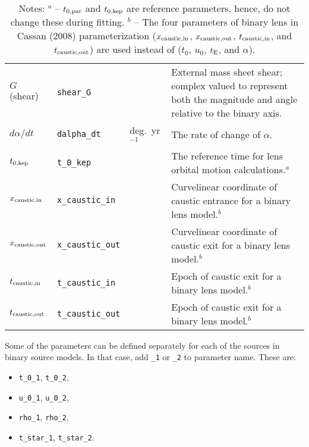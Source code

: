 \documentclass[12pt]{article}
\begin{document}
\begin{table*}[!h]
\begin{tabular}{l l l p{10cm}}
$G$ (shear) & {\tt shear\_G} & & External mass sheet shear; complex valued to represent both the magnitude and angle relative to the binary axis. \\
$d\alpha/dt$ & {\tt dalpha\_dt} & deg.~yr$^{-1}$ & The rate of change of $\alpha$. \\
$t_{0,{\rm kep}}$ & {\tt t\_0\_kep} & & The reference time for lens orbital motion calculations.$^a$ \\
$x_{\rm caustic, in}$ & {\tt x\_caustic\_in} & & Curvelinear coordinate of caustic entrance for a binary lens model.$^b$ \\
$x_{\rm caustic, out}$ & {\tt x\_caustic\_out} & & Curvelinear coordinate of caustic exit for a binary lens model.$^b$ \\
$t_{\rm caustic, in}$ & {\tt t\_caustic\_in} & & Epoch of caustic exit for a binary lens model.$^b$ \\
$t_{\rm caustic, out}$ & {\tt t\_caustic\_out} & & Epoch of caustic exit for a binary lens model.$^b$ \\
\hline
\end{tabular}
\caption{Notes: \newline
$^a$ -- $t_{0,{\rm par}}$ and $t_{0,{\rm kep}}$ are reference parameters, hence, do not change these during fitting. \newline
$^b$ -- The four parameters of binary lens in Cassan (2008) parameterization ($x_{\rm caustic, in}$, $x_{\rm caustic, out}$, $t_{\rm caustic, in}$, and $t_{\rm caustic, out}$) are used instead of ($t_0$, $u_0$, $t_{\rm E}$, and $\alpha$).
}
\end{table*}

Some of the parameters can be defined separately for each of the sources in binary source models.  
In that case, add {\tt \_1} or {\tt \_2} to parameter name. These are:
\begin{itemize}
\item {\tt t\_0\_1}, {\tt t\_0\_2},
\item {\tt u\_0\_1}, {\tt u\_0\_2},
\item {\tt rho\_1}, {\tt rho\_2},
\item {\tt t\_star\_1}, {\tt t\_star\_2}.
\end{itemize}
\end{document}

